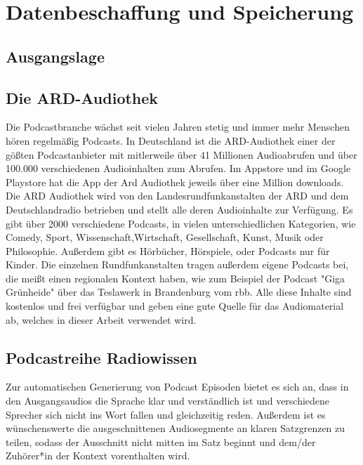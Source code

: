 \chapter{Datenbeschaffung und Speicherung}\label{ch:data}

\section{Ausgangslage}

\section{Die ARD-Audiothek}

Die Podcastbranche wächst seit vielen Jahren stetig und immer mehr Menschen hören regelmäßig Podcasts.
In Deutschland ist die ARD-Audiothek einer der gößten Podcastanbieter mit mitlerweile über 41 Millionen Audioabrufen und über 100.000 verschiedenen Audioinhalten zum Abrufen. 
Im Appstore und im Google Playstore hat die App der Ard Audiothek jeweils über eine Million downloads.
\cite{gotting2023}
Die ARD Audiothek wird von den Landesrundfunkanstalten der ARD und dem Deutschlandradio betrieben und stellt alle deren Audioinhalte zur Verfügung.
Es gibt über 2000 verschiedene Podcasts, in vielen unterschiedlichen Kategorien, wie Comedy, Sport, Wissenschaft,Wirtschaft, Gesellschaft, Kunst, Musik oder Philosophie.
Außerdem gibt es Hörbücher, Hörspiele, oder Podcasts nur für Kinder.
Die einzelnen Rundfunkanstalten tragen außerdem eigene Podcasts bei, die meißt einen regionalen Kontext haben, wie zum Beispiel der Podcast "Giga Grünheide" über das Teslawerk in Brandenburg vom rbb.
Alle diese Inhalte sind kostenlos und frei verfügbar und geben eine gute Quelle für das Audiomaterial ab, welches in dieser Arbeit verwendet wird.



\section{Podcastreihe Radiowissen}

Zur automatischen Generierung von Podcast Episoden bietet es sich an, dass in den Ausgangsaudios die Sprache klar und verständlich ist und verschiedene Sprecher sich nicht ins Wort fallen und gleichzeitig reden.
Außerdem ist es wünschenswerte die ausgeschnittenen Audiosegmente an klaren Satzgrenzen zu teilen, sodass der Ausschnitt nicht mitten im Satz beginnt und dem/der Zuhörer*in der Kontext vorenthalten wird. 

